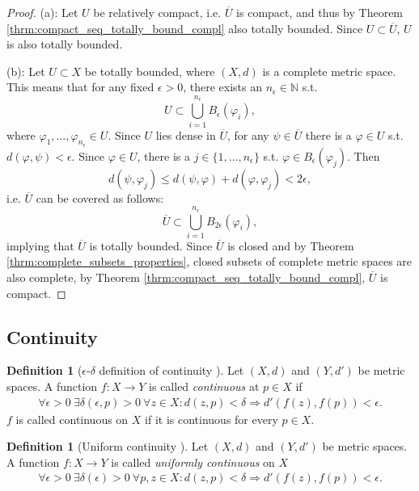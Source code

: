 \documentclass[12pt, a4paper]{article}
\numberwithin{equation}{section}
\theoremstyle{definition}
\theoremstyle{definition}
\newtheorem{defn}[thm]{Definition} %
\begin{document}
	\begin{proof}
		(a): Let $U$ be relatively compact, i.e. $\overline{U}$ is compact, and thus by Theorem \ref{thrm:compact_seq_totally_bound_compl} also totally bounded. Since $U\subset \overline{U}$, $U$ is also totally bounded.
		
		(b): Let $U\subset X$ be totally bounded, where $(X, d)$ is a complete metric space. This means that for any fixed $\epsilon > 0$, there exists an $n_{\epsilon}\in\mathbb N$ s.t.
		$$U\subset \bigcup_{i=1}^{n_{\epsilon}}B_{\epsilon}(\varphi_i),$$
		where $\varphi_1, \dots, \varphi_{n_{\epsilon}}\in U$. Since $U$ lies dense in $\overline{U}$, for any $\psi\in\overline{U}$ there is a $\varphi\in U$ s.t. $d(\varphi, \psi) < \epsilon$. Since $\varphi\in U$, there is a $j\in\{1, \dots, n_{\epsilon}\}$ s.t. $\varphi\in B_{\epsilon}(\varphi_j)$. Then
		$$d(\psi, \varphi_j) \leq d(\psi, \varphi) + d(\varphi, \varphi_j) < 2\epsilon,$$
		i.e. $\overline{U}$ can be covered as follows:
		$$\overline{U}\subset \bigcup_{i=1}^{n_{\epsilon}}B_{2\epsilon}(\varphi_i),$$ implying that $\overline{U}$ is totally bounded. Since $\overline{U}$ is closed and by Theorem \ref{thrm:complete_subsets_properties}, closed subsets of complete metric spaces are also complete, by Theorem \ref{thrm:compact_seq_totally_bound_compl}, $\overline{U}$ is compact.
	\end{proof}
	
	\newpage 
	\subsection{Continuity}
	\begin{defn}[$\epsilon$-$\delta$ definition of continuity \cite{MfPI}]\label{defn:continuity}
		Let $(X, d)$ and $(Y, d')$ be metric spaces. A function $f: X\rightarrow Y$ is called \textit{continuous} at $p\in X$ if 
		\begin{align}
			\forall \epsilon > 0\ \exists \delta(\epsilon, p) > 0\ \forall z\in X: d\left(z, p\right) < \delta \Rightarrow d'\left( f\left(z\right), f\left(p\right) \right) < \epsilon.  
		\end{align}
		$f$ is called continuous on $X$ if it is continuous for every $p\in X$.
	\end{defn}

	\begin{defn}[Uniform continuity \cite{src:uniform_continuity}]
		Let $(X, d)$ and $(Y, d')$ be metric spaces. A function $f: X\rightarrow Y$ is called \textit{uniformly continuous} on $X$
		\begin{align}
			\forall\epsilon > 0\ \exists \delta(\epsilon) > 0\ \forall p, z\in X: d\left(z, p\right) < \delta \Rightarrow d'\left( f\left(z\right), f\left(p\right) \right) < \epsilon.
		\end{align}
	\end{defn}
\end{document}
